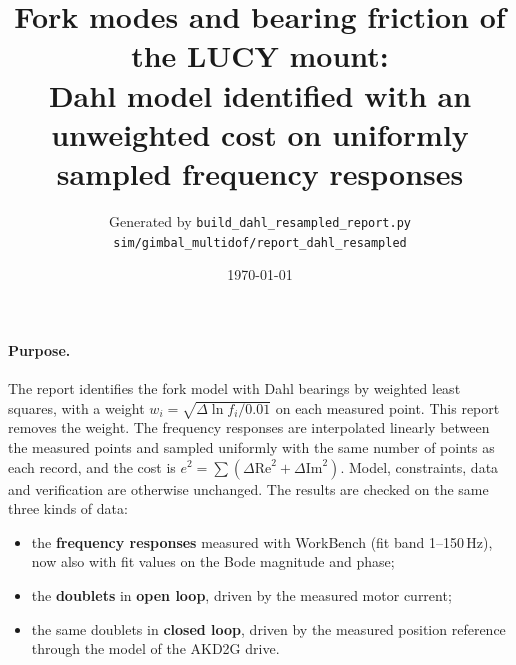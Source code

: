 \documentclass[10pt,a4paper]{article}
\title{Fork modes and bearing friction of the LUCY mount:\\ Dahl model identified with an unweighted cost on uniformly sampled frequency responses}
\author{Generated by \texttt{build\_dahl\_resampled\_report.py}\\ \small\texttt{sim/gimbal\_multidof/report\_dahl\_resampled}}
\date{\today}
\numberwithin{equation}{section}
\begin{document}
\maketitle

\paragraph{Purpose.} The report  identifies the fork model with Dahl bearings by weighted least squares, with a weight $w_i=\sqrt{\Delta\ln f_i/0.01}$ on each measured point. This report removes the weight. The frequency responses are interpolated linearly between the measured points and sampled uniformly with the same number of points as each record, and the cost is $e^2=\sum(\Delta\mathrm{Re}^2+\Delta\mathrm{Im}^2)$. Model, constraints, data and verification are otherwise unchanged. The results are checked on the same three kinds of data:
\begin{itemize}
\item the \textbf{frequency responses} measured with WorkBench (fit band 1--150\,Hz), now also with fit values on the Bode magnitude and phase;
\item the \textbf{doublets} in \textbf{open loop}, driven by the measured motor current;
\item the same doublets in \textbf{closed loop}, driven by the measured position reference through the model of the AKD2G drive.
\end{itemize}
\end{document}
